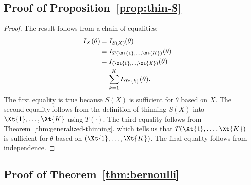 \documentclass[12pt]{article}
\begin{document}
\subsection{Proof of Proposition~\ref{prop:thin-S}} \label{app:pf-thin-S}

\begin{proof}
The result follows from a chain of equalities:
\begin{align*}
    I_X(\theta)&=I_{S(X)}(\theta)\\
    &=I_{T(\Xt{1},\ldots,\Xt{K})}(\theta)\\
    &=I_{(\Xt{1},\ldots,\Xt{K})}(\theta)\\
    &=\sum_{k=1}^K I_{\Xt{k}}(\theta).
\end{align*}
The first equality is true because $S(X)$ is sufficient for $\theta$ based on $X$.  The second equality follows from the definition of thinning $S(X)$ into $\Xt{1},\ldots,\Xt{K}$ using $T(\cdot)$.  The third equality follows from Theorem~\ref{thm:generalized-thinning}, which tells us that $T(\Xt{1},\ldots,\Xt{K})$ is sufficient for $\theta$ based on $(\Xt{1},\ldots,\Xt{K})$. The final equality follows from independence.
\end{proof}


\subsection{Proof of Theorem~\ref{thm:bernoulli}} \label{app:bernoulli-convolution}
\end{document}
